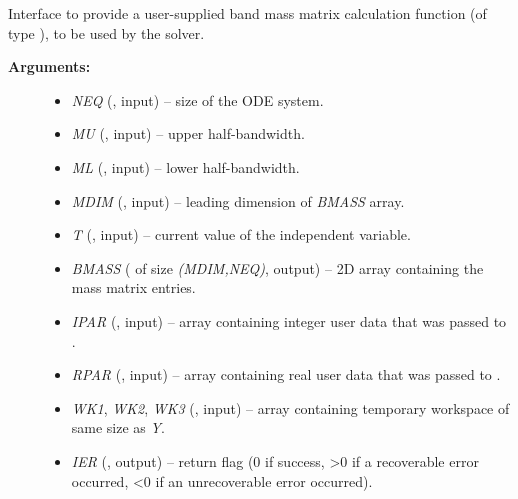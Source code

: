 \documentclass[letterpaper,10pt,english]{sphinxmanual}
\begin{document}
\begin{fulllineitems}
\label{f_interface/Usage:f/_/FARKBMASS}
Interface to provide a user-supplied band mass matrix calculation
function (of type {\hyperref[c_interface/User_supplied:c.ARKDlsBandMassFn]{\emph{}}}), to be used by the
{\hyperref[f_interface/Usage:f/_/FARKMASSBAND]{\emph{}}} solver.
\begin{description}
\item[{\textbf{Arguments:}}] \leavevmode\begin{itemize}
\item {} 
\emph{NEQ} (, input) -- size of the ODE system.

\item {} 
\emph{MU}   (, input) -- upper half-bandwidth.

\item {} 
\emph{ML}   (, input) -- lower half-bandwidth.

\item {} 
\emph{MDIM} (, input) -- leading dimension of \emph{BMASS} array.

\item {} 
\emph{T}    (, input) -- current value of the independent variable.

\item {} 
\emph{BMASS} ( of size \emph{(MDIM,NEQ)}, output) -- 2D array
containing the mass matrix entries.

\item {} 
\emph{IPAR} (, input) -- array containing integer user data that was passed to
{\hyperref[f_interface/Usage:f/_/FARKMALLOC]{\emph{}}}.

\item {} 
\emph{RPAR} (, input) -- array containing real user data that was passed to
{\hyperref[f_interface/Usage:f/_/FARKMALLOC]{\emph{}}}.

\item {} 
\emph{WK1}, \emph{WK2}, \emph{WK3}  (, input) -- array containing temporary workspace
of same size as \emph{Y}.

\item {} 
\emph{IER} (, output) -- return flag (0 if success, \textgreater{}0 if a recoverable error
occurred, \textless{}0 if an unrecoverable error occurred).


\end{itemize}
\end{description}
\end{fulllineitems}
\end{document}
